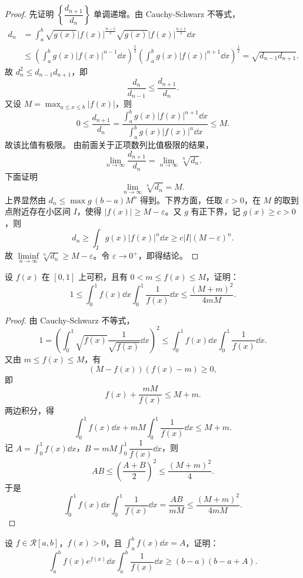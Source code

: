 \begin{proof}
	先证明 $\left\{\dfrac{d_{n+1}}{d_n}\right\}$ 单调递增。由 Cauchy-Schwarz 不等式，
	\[
	\begin{aligned}
		d_n
		&=\int_a^b \sqrt{g(x)}|f(x)|^{\frac{n-1}{2}}\sqrt{g(x)}|f(x)|^{\frac{n+1}{2}}\dd x \\
		&\leqslant \left(\int_a^b g(x)|f(x)|^{n-1}\dd x\right)^{\frac12}
		\left(\int_a^b g(x)|f(x)|^{n+1}\dd x\right)^{\frac12}
		=\sqrt{d_{n-1}d_{n+1}}.
	\end{aligned}
	\]
	故 $d_n^2\leqslant d_{n-1}d_{n+1}$，即
	\[
	\frac{d_n}{d_{n-1}}\leqslant \frac{d_{n+1}}{d_n}.
	\]
	又设 $M=\max_{a\leqslant x\leqslant b}|f(x)|$，则
	\[
	0\leqslant \frac{d_{n+1}}{d_n}
	=\frac{\int_a^b g(x)|f(x)|^{n+1}\dd x}{\int_a^b g(x)|f(x)|^n\dd x}
	\leqslant M.
	\]
	故该比值有极限。
	由前面关于正项数列比值极限的结果，
	\[
	\lim_{n\to\infty}\frac{d_{n+1}}{d_n}
	=\lim_{n\to\infty}\sqrt[n]{d_n}.
	\]
	下面证明
	\[
	\lim_{n\to\infty}\sqrt[n]{d_n}=M.
	\]
	上界显然由 $d_n\leqslant \max g\,(b-a)M^n$ 得到。下界方面，任取 $\varepsilon>0$，在 $M$ 的取到点附近存在小区间 $I$，使得 $|f(x)|\geqslant M-\varepsilon$。又 $g$ 有正下界，记 $g(x)\geqslant c>0$，则
	\[
	d_n\geqslant \int_I g(x)|f(x)|^n\dd x
	\geqslant c|I|(M-\varepsilon)^n.
	\]
	故 $\liminf\limits_{n\to\infty}\sqrt[n]{d_n}\geqslant M-\varepsilon$。令 $\varepsilon\to0^+$，即得结论。
\end{proof}

\begin{problem}
	设 $f(x)$ 在 $[0,1]$ 上可积，且有 $0<m\leqslant f(x)\leqslant M$，证明：
	\[
	1\leqslant \int_0^1 f(x)\dd x\int_0^1\frac1{f(x)}\dd x
	\leqslant \frac{(M+m)^2}{4mM}.
	\]
\end{problem}

\begin{proof}
	由 Cauchy-Schwarz 不等式，
	\[
	1=\left(\int_0^1 \sqrt{f(x)}\frac1{\sqrt{f(x)}}\dd x\right)^2
	\leqslant \int_0^1 f(x)\dd x\int_0^1\frac1{f(x)}\dd x.
	\]
	又由 $m\leqslant f(x)\leqslant M$，有
	\[
	(M-f(x))(f(x)-m)\geqslant 0,
	\]
	即
	\[
	f(x)+\frac{mM}{f(x)}\leqslant M+m.
	\]
	两边积分，得
	\[
	\int_0^1 f(x)\dd x+mM\int_0^1\frac1{f(x)}\dd x\leqslant M+m.
	\]
	记 $A=\displaystyle\int_0^1 f(x)\dd x$，$B=mM\displaystyle\int_0^1\dfrac1{f(x)}\dd x$，则
	\[
	AB\leqslant \left(\frac{A+B}{2}\right)^2\leqslant \frac{(M+m)^2}{4}.
	\]
	于是
	\[
	\int_0^1 f(x)\dd x\int_0^1\frac1{f(x)}\dd x
	=\frac{AB}{mM}\leqslant \frac{(M+m)^2}{4mM}.
	\]
\end{proof}

\begin{problem}
	设 $f\in\mathcal{R}[a,b]$，$f(x)>0$，且 $\displaystyle\int_a^b f(x)\dd x=A$，证明：
	\[
	\int_a^b f(x)e^{f(x)}\dd x\int_a^b\frac1{f(x)}\dd x
	\geqslant (b-a)(b-a+A).
	\]
\end{problem}

